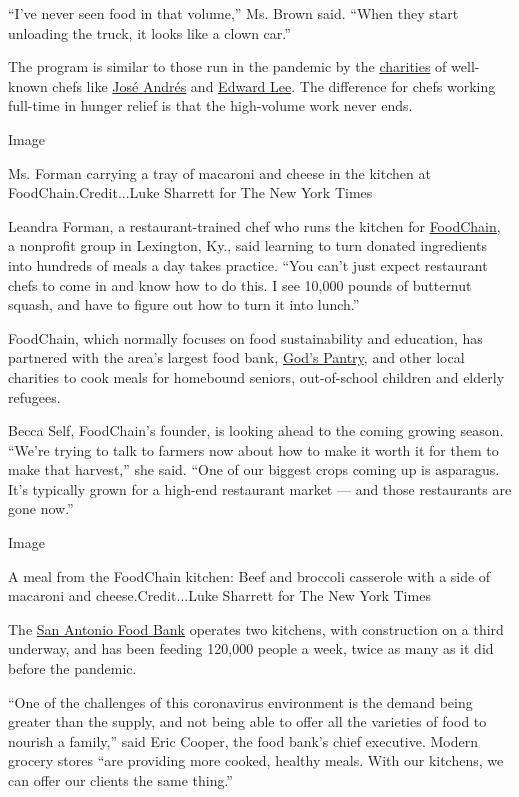 ``I've never seen food in that volume,'' Ms. Brown said. ``When they
start unloading the truck, it looks like a clown car.''

The program is similar to those run in the pandemic by the
\href{https://www.nytimes3xbfgragh.onion/2020/03/24/dining/restaurants-closing-workers-coronavirus.html}{charities}
of well-known chefs like \href{https://wck.org/}{José Andrés} and
\href{https://leeinitiative.org/}{Edward Lee}. The difference for chefs
working full-time in hunger relief is that the high-volume work never
ends.

Image

Ms. Forman carrying a tray of macaroni and cheese in the kitchen at
FoodChain.Credit...Luke Sharrett for The New York Times

Leandra Forman, a restaurant-trained chef who runs the kitchen for
\href{http://foodchainlex.org/}{FoodChain}, a nonprofit group in
Lexington, Ky., said learning to turn donated ingredients into hundreds
of meals a day takes practice. ``You can't just expect restaurant chefs
to come in and know how to do this. I see 10,000 pounds of butternut
squash, and have to figure out how to turn it into lunch.''

FoodChain, which normally focuses on food sustainability and education,
has partnered with the area's largest food bank,
\href{https://godspantry.org/}{God's Pantry}, and other local charities
to cook meals for homebound seniors, out-of-school children and elderly
refugees.

Becca Self, FoodChain's founder, is looking ahead to the coming growing
season. ``We're trying to talk to farmers now about how to make it worth
it for them to make that harvest,'' she said. ``One of our biggest crops
coming up is asparagus. It's typically grown for a high-end restaurant
market --- and those restaurants are gone now.''

Image

A meal from the FoodChain kitchen: Beef and broccoli casserole with a
side of macaroni and cheese.Credit...Luke Sharrett for The New York
Times

The \href{https://safoodbank.org/}{San Antonio Food Bank} operates two
kitchens, with construction on a third underway, and has been feeding
120,000 people a week, twice as many as it did before the pandemic.

``One of the challenges of this coronavirus environment is the demand
being greater than the supply, and not being able to offer all the
varieties of food to nourish a family,'' said Eric Cooper, the food
bank's chief executive. Modern grocery stores ``are providing more
cooked, healthy meals. With our kitchens, we can offer our clients the
same thing.''

